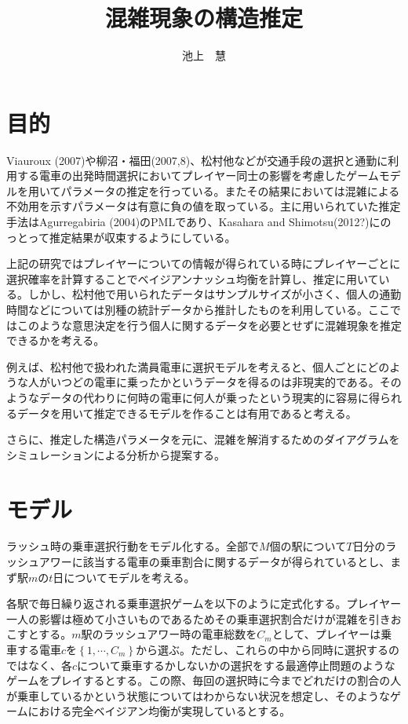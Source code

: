 \documentclass{jsarticle}
\begin{document}
\title{混雑現象の構造推定}
\author{池上　慧}
\maketitle

\section{目的}
Viauroux (2007)や柳沼・福田(2007,8)、松村他などが交通手段の選択と通勤に利用する電車の出発時間選択においてプレイヤー同士の影響を考慮したゲームモデルを用いてパラメータの推定を行っている。またその結果においては混雑による不効用を示すパラメータは有意に負の値を取っている。主に用いられていた推定手法はAgurregabiria (2004)のPMLであり、Kasahara and Shimotsu(2012?)にのっとって推定結果が収束するようにしている。

上記の研究ではプレイヤーについての情報が得られている時にプレイヤーごとに選択確率を計算することでベイジアンナッシュ均衡を計算し、推定に用いている。しかし、松村他で用いられたデータはサンプルサイズが小さく、個人の通勤時間などについては別種の統計データから推計したものを利用している。ここではこのような意思決定を行う個人に関するデータを必要とせずに混雑現象を推定できるかを考える。

例えば、松村他で扱われた満員電車に選択モデルを考えると、個人ごとにどのような人がいつどの電車に乗ったかというデータを得るのは非現実的である。そのようなデータの代わりに何時の電車に何人が乗ったという現実的に容易に得られるデータを用いて推定できるモデルを作ることは有用であると考える。

さらに、推定した構造パラメータを元に、混雑を解消するためのダイアグラムをシミュレーションによる分析から提案する。

\section{モデル}
ラッシュ時の乗車選択行動をモデル化する。全部で$M$個の駅について$T$日分のラッシュアワーに該当する電車の乗車割合に関するデータが得られているとし、まず駅$m$の$t$日についてモデルを考える。

各駅で毎日繰り返される乗車選択ゲームを以下のように定式化する。プレイヤー一人の影響は極めて小さいものであるためその乗車選択割合だけが混雑を引きおこすとする。$m$駅のラッシュアワー時の電車総数を$C_m$として、プレイヤーは乗車する電車$c$を$\left\{ 1, \cdots, C_m\right\}$から選ぶ。ただし、これらの中から同時に選択するのではなく、各$c$について乗車するかしないかの選択をする最適停止問題のようなゲームをプレイするとする。この際、毎回の選択時に今までどれだけの割合の人が乗車しているかという状態についてはわからない状況を想定し、そのようなゲームにおける完全ベイジアン均衡が実現しているとする。
\end{document}
